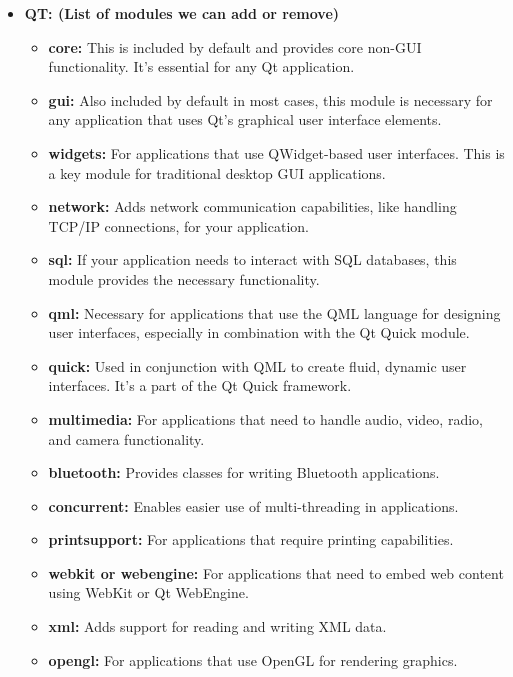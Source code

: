 \documentclass{report}
\begin{document}
\begin{itemize}
\begin{itemize}
            \end{itemize}
            \pagebreak
        \item \textbf{QT: (List of modules we can add or remove)}
            \begin{itemize}
                    \item \textbf{core:} This is included by default and provides core non-GUI functionality. It's essential for any Qt application.
                   \item \textbf{gui:} Also included by default in most cases, this module is necessary for any application that uses Qt's graphical user interface elements.
                \item \textbf{widgets:} For applications that use QWidget-based user interfaces. This is a key module for traditional desktop GUI applications.
                \item \textbf{network:} Adds network communication capabilities, like handling TCP/IP connections, for your application.
                \item \textbf{sql:} If your application needs to interact with SQL databases, this module provides the necessary functionality.
                \item \textbf{qml:} Necessary for applications that use the QML language for designing user interfaces, especially in combination with the Qt Quick module.
                \item \textbf{quick:} Used in conjunction with QML to create fluid, dynamic user interfaces. It's a part of the Qt Quick framework.
                \item \textbf{multimedia:} For applications that need to handle audio, video, radio, and camera functionality.
                \item \textbf{bluetooth:} Provides classes for writing Bluetooth applications.
                \item \textbf{concurrent:} Enables easier use of multi-threading in applications.
                \item \textbf{printsupport:} For applications that require printing capabilities.
                \item \textbf{webkit or webengine:} For applications that need to embed web content using WebKit or Qt WebEngine.
                \item \textbf{xml:} Adds support for reading and writing XML data.
                \item \textbf{opengl:} For applications that use OpenGL for rendering graphics.

\end{itemize}
\end{itemize}
\end{document}
